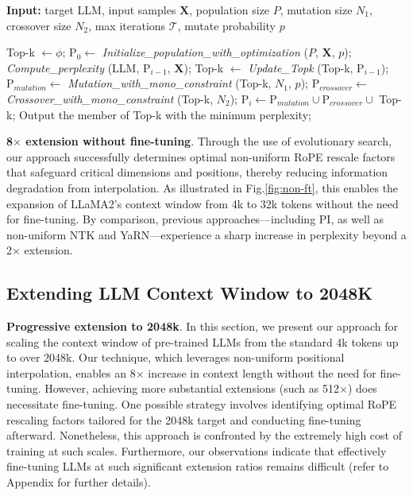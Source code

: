 \begin{algorithm}[t]
	\small
	\caption{The search algorithm}
	\textbf{Input:} target LLM, input samples $\mathbf{X}$, population size $P$, mutation size $N_1$, crossover size $N_2$, max iterations $\mathcal{T}$, mutate probability $p$\\

	\begin{algorithmic}[1]
		\label{alg:search}
		\STATE Top-k $\gets \phi$;
		\STATE $\text{P}_0 \gets$ \textit{Initialize\_population\_with\_optimization} ($P$, $\mathbf{X}$, $p$);
		\STATE \textit{Compute\_perplexity} (LLM, $\text{P}_{i-1}$, $\mathbf{X}$);
		\STATE Top-k $\gets$ \textit{Update\_Topk} (Top-k, $\text{P}_{i-1}$);
		\STATE $\text{P}_{mutation} \gets$ \textit{Mutation\_with\_mono\_constraint} (Top-k, $N_1$, $p$);
		\STATE $\text{P}_{crossover} \gets$ \textit{Crossover\_with\_mono\_constraint} (Top-k, $N_2$);
		\STATE $\text{P}_i \gets \text{P}_{mutation} \cup \text{P}_{crossover} \cup$ Top-k;
		\ENDFOR
		\STATE Output the member of Top-k with the minimum perplexity;
	\end{algorithmic}
\end{algorithm}

\textbf{8$\times$ extension without fine-tuning}. Through the use of evolutionary search, our approach successfully determines optimal non-uniform RoPE rescale factors that safeguard critical dimensions and positions, thereby reducing information degradation from interpolation. As illustrated in Fig.\ref{fig:non-ft}, this enables the expansion of LLaMA2's context window from 4k to 32k tokens without the need for fine-tuning. By comparison, previous approaches—including PI, as well as non-uniform NTK and YaRN—experience a sharp increase in perplexity beyond a 2$\times$ extension.

\subsection{Extending LLM Context Window to 2048K}
\label{sec:extendto2048k}

\textbf{Progressive extension to 2048k}. In this section, we present our approach for scaling the context window of pre-trained LLMs from the standard 4k tokens up to over 2048k. Our technique, which leverages non-uniform positional interpolation, enables an 8$\times$ increase in context length without the need for fine-tuning. However, achieving more substantial extensions (such as 512$\times$) does necessitate fine-tuning. One possible strategy involves identifying optimal RoPE rescaling factors tailored for the 2048k target and conducting fine-tuning afterward. Nonetheless, this approach is confronted by the extremely high cost of training at such scales. Furthermore, our observations indicate that effectively fine-tuning LLMs at such significant extension ratios remains difficult (refer to Appendix for further details).

